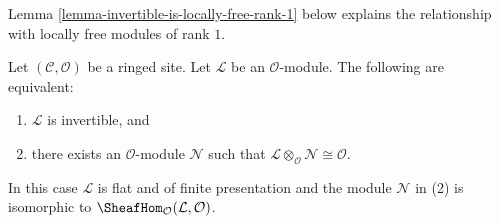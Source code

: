 \noindent
Lemma \ref{lemma-invertible-is-locally-free-rank-1}
below explains the relationship with locally free modules
of rank $1$.

\begin{lemma}
\label{lemma-invertible}
Let $(\mathcal{C}, \mathcal{O})$ be a ringed site. Let $\mathcal{L}$
be an $\mathcal{O}$-module. The following are equivalent:
\begin{enumerate}
\item $\mathcal{L}$ is invertible, and
\item there exists an $\mathcal{O}$-module $\mathcal{N}$
such that
$\mathcal{L} \otimes_\mathcal{O} \mathcal{N} \cong \mathcal{O}$.
\end{enumerate}
In this case $\mathcal{L}$ is flat and of finite presentation
and the module $\mathcal{N}$ in (2) is isomorphic to
$\SheafHom_\mathcal{O}(\mathcal{L}, \mathcal{O})$.
\end{lemma}

